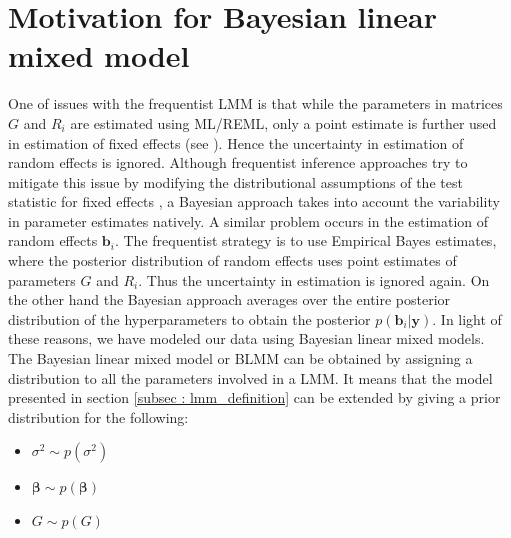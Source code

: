 \section{Motivation for Bayesian linear mixed model}
\label{sec : blmm}
One of issues with the frequentist LMM is that while the parameters in matrices $G$ and $R_i$ are estimated using ML/REML, only a point estimate is further used in estimation of fixed effects (see \cite[chap. 5]{verbeke_linear_2009}). Hence the uncertainty in estimation of random effects is ignored. Although frequentist inference approaches try to mitigate this issue by modifying the distributional assumptions of the test statistic for fixed effects \citep[pg. 56]{verbeke_linear_2009}, a Bayesian approach takes into account the variability in parameter estimates natively. A similar problem occurs in the estimation of random effects $\boldsymbol{b}_i$. The frequentist strategy is to use Empirical Bayes estimates, where the posterior distribution of random effects uses point estimates of parameters $G$ and $R_i$. Thus the uncertainty in estimation is ignored again. On the other hand the Bayesian approach averages over the entire posterior distribution of the hyperparameters to obtain the posterior $p(\boldsymbol{b}_i|\boldsymbol{y})$. In light of these reasons, we have modeled our data using Bayesian linear mixed models.\\

The Bayesian linear mixed model or BLMM can be obtained by assigning a distribution to all the parameters involved in a LMM. It means that the model presented in section \ref{subsec : lmm_definition} can be extended by giving a prior distribution for the following:
\begin{itemize}
\item $\sigma^2 \sim p(\sigma^2)$
\item $\boldsymbol{\beta} \sim p(\boldsymbol{\beta})$
\item $G \sim p(G)$
\end{itemize}

